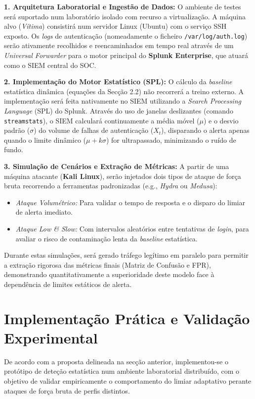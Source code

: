 \documentclass[12pt,a4paper]{article}
\begin{document}
\textbf{1. Arquitetura Laboratorial e Ingestão de Dados:}
O ambiente de testes será suportado num laboratório isolado com recurso a virtualização. A máquina alvo (\textit{Vítima}) consistirá num servidor Linux (Ubuntu) com o serviço SSH exposto. Os \textit{logs} de autenticação (nomeadamente o ficheiro \texttt{/var/log/auth.log}) serão ativamente recolhidos e reencaminhados em tempo real através de um \textit{Universal Forwarder} para o motor principal do \textbf{Splunk Enterprise}, que atuará como o SIEM central do SOC.

\textbf{2. Implementação do Motor Estatístico (SPL):}
O cálculo da \textit{baseline} estatística dinâmica (equações da Secção 2.2) não recorrerá a treino externo. A implementação será feita nativamente no SIEM utilizando a \textit{Search Processing Language} (SPL) do Splunk. Através do uso de janelas deslizantes (comando \texttt{streamstats}), o SIEM calculará continuamente a média móvel ($\mu$) e o desvio padrão ($\sigma$) do volume de falhas de autenticação ($X_t$), disparando o alerta apenas quando o limite dinâmico ($\mu + k\sigma$) for ultrapassado, minimizando o ruído de fundo.

\textbf{3. Simulação de Cenários e Extração de Métricas:}
A partir de uma máquina atacante (\textbf{Kali Linux}), serão injetados dois tipos de ataque de força bruta recorrendo a ferramentas padronizadas (e.g., \textit{Hydra} ou \textit{Medusa}):
\begin{itemize}
    \item \textit{Ataque Volumétrico:} Para validar o tempo de resposta e o disparo do limiar de alerta imediato.
    \item \textit{Ataque Low \& Slow:} Com intervalos aleatórios entre tentativas de \textit{login}, para avaliar o risco de contaminação lenta da \textit{baseline} estatística.
\end{itemize}
Durante estas simulações, será gerado tráfego legítimo em paralelo para permitir a extração rigorosa das métricas finais (Matriz de Confusão e FPR), demonstrando quantitativamente a superioridade deste modelo face à dependência de limites estáticos de alerta.





\newpage
\section{Implementação Prática e Validação Experimental}

De acordo com a proposta delineada na secção anterior, implementou-se o protótipo de deteção estatística num ambiente laboratorial distribuído, com o objetivo de validar empiricamente o comportamento do limiar adaptativo perante ataques de força bruta de perfis distintos.
\end{document}
